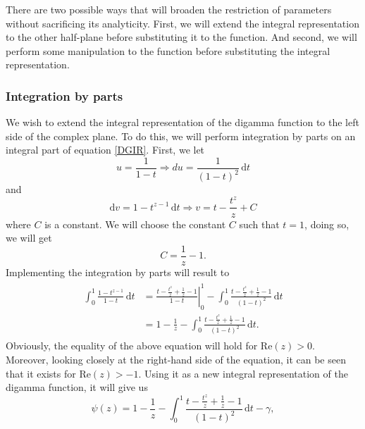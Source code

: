There are two possible ways that will broaden the restriction of parameters without sacrificing its analyticity. First, we will extend the integral representation to the other half-plane before substituting it to the function.  And second, we will perform some manipulation to the function before substituting the integral representation. 

\subsubsection{Integration by parts}

We wish to extend the integral representation of the digamma function to the left side of the complex plane. To do this, we will perform integration by parts on an integral part of equation \eqref{DGIR}. First, we let 
\begin{equation}
    u = \frac{1}{1-t} \Longrightarrow du = \frac{1}{(1-t)^2} \, \mathrm{d}t
\end{equation}
and 
\begin{equation}
\mathrm{d}v = 1-t^{z-1} \, \mathrm{d}t \Longrightarrow v = t - \frac{t^{z}}{z} +C
\end{equation}
where $C$ is a constant. We will choose the constant $C$ such that $t = 1$, doing so, we will get
\begin{equation}
    C = \frac{1}{z} - 1.
\end{equation}
Implementing the integration by parts will result to
\begin{align}
\begin{split} 
    \int_{0}^{1} \frac{1-t^{z-1}}{1-t}\, \mathrm{d}t & = \left.  \frac{t - \frac{t^{z}}{z}+\frac{1}{z} - 1}{1-t} \right|_{0}^{1} - \int_{0}^{1} \frac{t - \frac{t^{z}}{z}+\frac{1}{z} - 1}{(1-t)^2} \, \mathrm{d}t
    \\& = 1 - \frac{1}{z} - \int_{0}^{1} \frac{t - \frac{t^{z}}{z}+\frac{1}{z} - 1}{(1-t)^2} \, \mathrm{d}t.
\end{split}
\end{align}
Obviously, the equality of the above equation will hold for $\mathrm{Re}(z) > 0$. Moreover, looking closely at the right-hand side of the equation, it can be seen that it exists for $\mathrm{Re}(z) > -1$. Using it as a new integral representation of the digamma function, it will give us
\begin{equation} \label{DGIR1}
    \psi(z) = 1 - \frac{1}{z} - \int_{0}^{1} \frac{t - \frac{t^{z}}{z}+\frac{1}{z} - 1}{(1-t)^2} \, \mathrm{d}t - \gamma,
\end{equation} 
